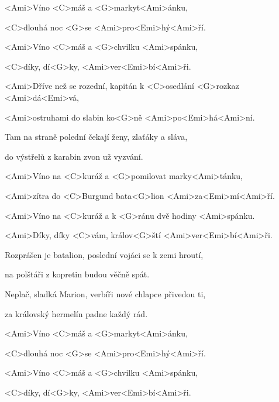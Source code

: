 

<Ami>Víno <C>máš a <G>markyt<Ami>ánku,

<C>dlouhá noc <G>se <Ami>pro<Emi>hý<Ami>ří.

<Ami>Víno <C>máš a <G>chvilku <Ami>spánku,

<C>díky, dí<G>ky, <Ami>ver<Emi>bí<Ami>ři.

\zs
<Ami>Dříve než se rozední,
kapitán k <C>osedlání <G>rozkaz <Ami>dá<Emi>vá,

<Ami>ostruhami do slabin ko<G>ně <Ami>po<Emi>há<Ami>ní.

Tam na straně polední
čekají ženy, zlaťáky a sláva,

do výstřelů z karabin zvon už vyzvání.
\ks

\zr
<Ami>Víno na <C>kuráž a <G>pomilovat marky<Ami>tánku,

<Ami>zítra do <C>Burgund bata<G>lion 
<Ami>za<Emi>mí<Ami>ří.

<Ami>Víno na <C>kuráž a k <G>ránu dvě hodiny <Ami>spánku.

<Ami>Díky, díky <C>vám, králov<G>ští 
<Ami>ver<Emi>bí<Ami>ři.
\kr

\zs
Rozprášen je batalion,
poslední vojáci se k zemi hroutí,

na polštáři z kopretin budou věčně spát.

Neplač, sladká Marion,
verbíři nové chlapce přivedou ti,

za královský hermelín padne každý rád.
\ks

\zr \kr

<Ami>Víno <C>máš a <G>markyt<Ami>ánku,

<C>dlouhá noc <G>se <Ami>pro<Emi>hý<Ami>ří.

<Ami>Víno <C>máš a <G>chvilku <Ami>spánku,

<C>díky, dí<G>ky, <Ami>ver<Emi>bí<Ami>ři.

\kp
